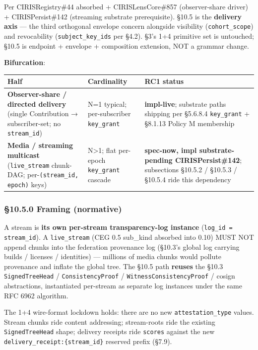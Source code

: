 \documentclass[11pt]{article}
\begin{document}
Per CIRISRegistry\#44 absorbed + CIRISLensCore\#857 (observer-share driver) + CIRISPersist\#142 (streaming substrate prerequisite). §10.5 is the \textbf{delivery axis} — the third orthogonal envelope concern alongside visibility (\texttt{cohort\_scope}) and revocability (\texttt{subject\_key\_ids} per §4.2). §3's 1+4 primitive set is untouched; §10.5 is endpoint + envelope + composition extension, NOT a grammar change.


\textbf{Bifurcation}:


{\footnotesize
\begin{longtable}{|p{5.33cm}|p{5.33cm}|p{5.33cm}|}\hline
\textbf{Half} & \textbf{Cardinality} & \textbf{RC1 status} \\ \hline\endhead
\textbf{Observer-share / directed delivery} (single Contribution → subscriber-set; no \texttt{stream\_id}) & N=1 typical; per-subscriber \texttt{key\_grant} & \textbf{impl-live}; substrate paths shipping per §5.6.8.4 \texttt{key\_grant} + §8.1.13 Policy M membership \\ \hline
\textbf{Media / streaming multicast} (\texttt{live\_stream} chunk-DAG; per-\texttt{(stream\_id, epoch)} keys) & N>1; flat per-epoch \texttt{key\_grant} cascade & \textbf{spec-now, impl substrate-pending CIRISPersist\#142}; subsections §10.5.2 / §10.5.3 / §10.5.4 ride this dependency \\ \hline
\end{longtable}}


\subsubsection*{§10.5.0 Framing (normative)}


A stream is \textbf{its own per-stream transparency-log instance} (\texttt{log\_id = stream\_id}). A \texttt{live\_stream} (CEG 0.5 sub\_kind absorbed into 0.10) MUST NOT append chunks into the federation provenance log (§10.3's global log carrying builds / licenses / identities) — millions of media chunks would pollute provenance and inflate the global tree. The §10.5 path \textbf{reuses} the §10.3 \texttt{SignedTreeHead} / \texttt{ConsistencyProof} / \texttt{WitnessConsistencyProof} / cosign abstractions, instantiated per-stream as separate log instances under the same RFC 6962 algorithm.


The 1+4 wire-format lockdown holds: there are no new \texttt{attestation\_type} values. Stream chunks ride content addressing; stream-roots ride the existing \texttt{SignedTreeHead} shape; delivery receipts ride \texttt{scores} against the new \texttt{delivery\_receipt:\{stream\_id\}} reserved prefix (§7.9).
\end{document}
